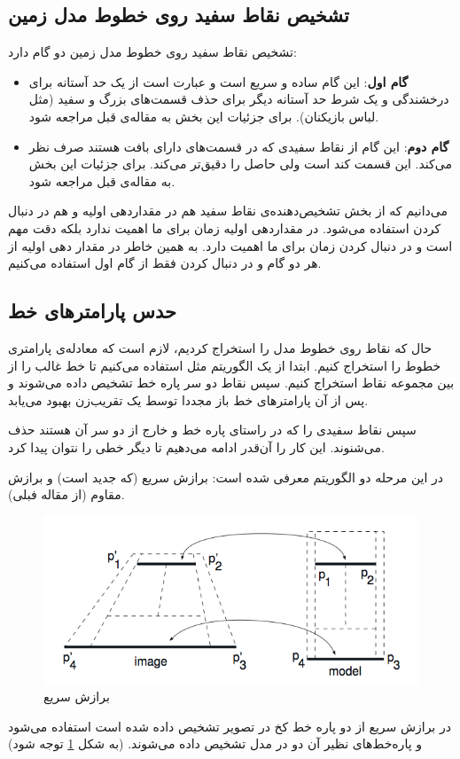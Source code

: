 \documentclass{report}
\begin{document}
\subsection{تشخیص نقاط سفید روی خطوط مدل زمین}
تشخیص نقاط سفید روی خطوط مدل زمین دو گام دارد:
\begin{itemize}
\item \textbf{گام اول}: 
این گام ساده و سریع است و عبارت است از یک حد آستانه برای درخشندگی و یک شرط حد آستانه دیگر برای حذف قسمت‌های بزرگ و سفید (مثل لباس بازیکنان). برای جزئیات این بخش به مقاله‌ی قبل مراجعه\cite{old_paper} شود.
\item \textbf{گام دوم}: 
این گام از نقاط سفیدی که در قسمت‌های دارای بافت هستند صرف نظر می‌کند. این قسمت کند است ولی حاصل را دقیق‌تر می‌کند. برای جزئیات این بخش به مقاله‌ی قبل مراجعه\cite{old_paper} شود.
\end{itemize}
می‌دانیم که از بخش تشخیص‌دهنده‌ی نقاط سفید هم در مقداردهی اولیه و هم در دنبال کردن استفاده می‌شود. در مقداردهی اولیه زمان برای ما اهمیت ندارد بلکه دقت مهم است و در دنبال کردن زمان برای ما اهمیت دارد. به همین خاطر در مقدار دهی اولیه از هر دو گام و در دنبال کردن فقط از گام اول استفاده می‌کنیم.
\subsection{حدس پارامترهای خط}
حال که نقاط روی خطوط مدل را استخراج کردیم، لازم است که معادله‌ی پارامتری خطوط را استخراج کنیم. ابتدا از یک الگوریتم مثل  استفاده می‌کنیم تا خط غالب را از بین مجموعه نقاط استخراج کنیم. سپس نقاط دو سر پاره خط تشخیص داده می‌شوند و پس از آن پارامترهای خط باز مجددا توسط یک تقریب‌زن  بهبود می‌یابد.

سپس نقاط سفیدی را که در راستای پاره خط و خارج از دو سر آن هستند حذف می‌شنوند. این کار را آن‌قدر ادامه می‌دهیم تا دیگر خطی را نتوان پیدا کرد.

در این مرحله دو الگوریتم معرفی شده است: برازش سریع (که جدید است) و برازش مقاوم (از مقاله فبلی).
\begin{figure}
\centering
\includegraphics[scale=0.5]{fast_fitting.png}
\caption{برازش سریع}
\label{fast_fitting}
\end{figure}
در برازش سریع از دو پاره خط کخ در تصویر تشخیص داده شده است استفاده می‌شود و پاره‌خط‌های  نظیر آن دو در مدل تشخیص داده می‌شوند. (به شکل \ref{fast_fitting} توجه شود)

\begin{latin}
{}

\end{latin}
\end{document}
